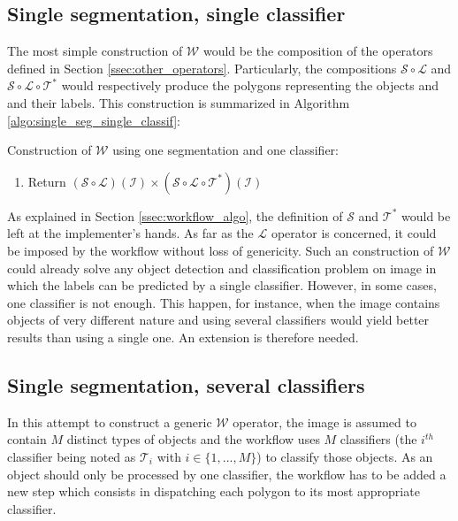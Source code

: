 \subsection{Single segmentation, single classifier}
\label{ssec:single_single}

The most simple construction of $\mathcal{W}$ would be the composition of the operators defined in Section \ref{ssec:other_operators}. Particularly, the compositions $\mathcal{S} \circ \mathcal{L}$ and $\mathcal{S} \circ \mathcal{L} \circ \mathcal{T}^*$ would respectively produce the polygons representing the objects and and their labels. This construction is summarized in Algorithm \ref{algo:single_seg_single_classif}: 

\begin{algorithm} \label{algo:single_seg_single_classif} 
	Construction of $\mathcal{W}$ using one segmentation and one classifier:
	
	\begin{enumerate}
		\item Return $\left(\mathcal{S} \circ \mathcal{L}\right)\left(\mathcal{I}\right) \times \left(\mathcal{S} \circ \mathcal{L} \circ \mathcal{T}^*\right)\left(\mathcal{I}\right)$
	\end{enumerate}
\end{algorithm}

As explained in Section \ref{ssec:workflow_algo}, the definition of $\mathcal{S}$ and $\mathcal{T}^*$ would be left at the implementer's hands. As far as the $\mathcal{L}$ operator is concerned, it could be imposed by the workflow without loss of genericity. Such an construction of $\mathcal{W}$ could already solve any object detection and classification problem on image in which the labels can be predicted by a single classifier. However, in some cases, one classifier is not enough. This happen, for instance, when the image contains objects of very different nature and using several classifiers would yield better results than using a single one. An extension is therefore needed.

\subsection{Single segmentation, several classifiers}
\label{ssec:single_several}

In this attempt to construct a generic $\mathcal{W}$ operator, the image is assumed to contain $M$ distinct types of objects and the workflow uses $M$ classifiers (the $i^{th}$ classifier being noted as $\mathcal{T}_i$ with $i \in \{1,...,M\}$) to classify those objects. As an object should only be processed by one classifier, the workflow has to be added a new step which consists in dispatching each polygon to its most appropriate classifier. 

